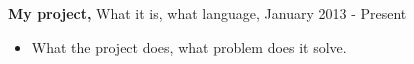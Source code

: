{{\bf My project,} What it is, what language}, January 2013 - Present
\begin{itemize}
\item What the project does, what problem does it solve.
\end{itemize} 